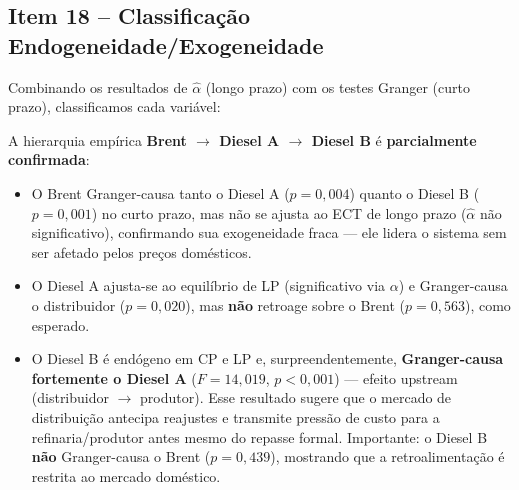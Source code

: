 \documentclass[12pt,a4paper]{article}
\begin{document}
\subsection{Item 18 -- Classificação Endogeneidade/Exogeneidade}

Combinando os resultados de $\hat{\alpha}$ (longo prazo) com os testes Granger
(curto prazo), classificamos cada variável:

\begin{table}[H]
\centering
\caption{Classificação das Variáveis por Grau de Endogeneidade (resultados par-a-par)}
\label{tab:classif}
\end{table}

\noindent
A hierarquia empírica \textbf{Brent $\to$ Diesel A $\to$ Diesel B} é
\textbf{parcialmente confirmada}:
\begin{itemize}
  \item O Brent Granger-causa tanto o Diesel A ($p = 0{,}004$) quanto o
        Diesel B ($p = 0{,}001$) no curto prazo, mas não se ajusta ao ECT
        de longo prazo ($\hat{\alpha}$ não significativo), confirmando sua
        exogeneidade fraca --- ele lidera o sistema sem ser afetado pelos
        preços domésticos.
  \item O Diesel A ajusta-se ao equilíbrio de LP (significativo via $\alpha$)
        e Granger-causa o distribuidor ($p = 0{,}020$), mas \textbf{não}
        retroage sobre o Brent ($p = 0{,}563$), como esperado.
  \item O Diesel B é endógeno em CP e LP e, surpreendentemente,
        \textbf{Granger-causa fortemente o Diesel A} ($F = 14{,}019$,
        $p < 0{,}001$) --- efeito upstream (distribuidor $\to$ produtor).
        Esse resultado sugere que o mercado de distribuição antecipa
        reajustes e transmite pressão de custo para a refinaria/produtor
        antes mesmo do repasse formal. Importante: o Diesel B
        \textbf{não} Granger-causa o Brent ($p = 0{,}439$),
        mostrando que a retroalimentação é restrita ao mercado doméstico.
\end{itemize}
\end{document}
